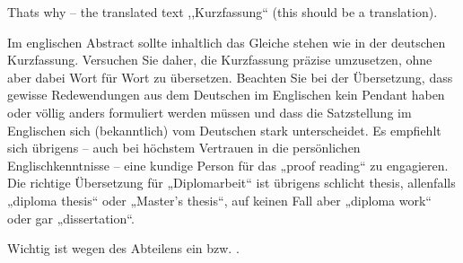 
Thats why -- the translated text ,,Kurzfassung`` (this should be
a translation).

Im englischen Abstract sollte inhaltlich das Gleiche stehen wie in
der deutschen Kurzfassung. Versuchen Sie daher, die Kurzfassung präzise
umzusetzen, ohne aber dabei Wort für Wort zu übersetzen. Beachten
Sie bei der Übersetzung, dass gewisse Redewendungen aus dem Deutschen
im Englischen kein Pendant haben oder völlig anders formuliert werden
müssen und dass die Satzstellung im Englischen sich (bekanntlich)
vom Deutschen stark unterscheidet. Es empfiehlt sich übrigens – auch
bei höchstem Vertrauen in die persönlichen Englischkenntnisse – eine
kundige Person für das „proof reading“ zu engagieren. Die richtige
Übersetzung für „Diplomarbeit“ ist übrigens schlicht thesis, allenfalls
„diploma thesis“ oder „Master’s thesis“, auf keinen Fall aber „diploma
work“ oder gar „dissertation“\citep{hagenberg}.

Wichtig ist wegen des Abteilens ein 
bzw. .
